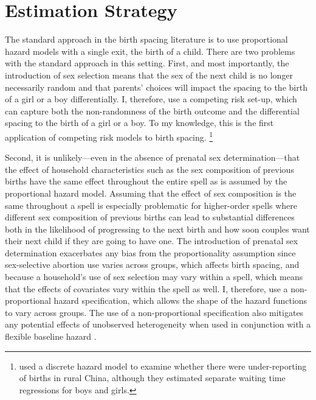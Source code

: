 \documentclass[12pt,letterpaper]{article}
\begin{document}


\section{Estimation Strategy\label{sec:strategy}}


The standard approach in the birth spacing literature is to use proportional hazard
models with a single exit, the birth of a child.
There are two problems with the standard approach in this setting.
First, and most importantly, the introduction of sex selection means that the sex of the 
next child is no longer necessarily random and that parents' choices will impact the 
spacing to the birth of a girl or a boy differentially.
I, therefore, use a competing risk set-up, which can capture both the non-randomness of
the birth outcome and the differential spacing to the birth of a girl or a boy.
To my knowledge, this is the first application of competing risk models to birth
spacing.%
\footnote{
\cite{Merli2000} used a discrete hazard model to examine whether 
there were under-reporting of births in rural China, although they 
estimated separate waiting time regressions for boys and girls.
}

Second, it is unlikely---even in the absence of prenatal sex determination---that the 
effect of household characteristics such as the sex composition of previous births have 
the same effect throughout the entire spell as is assumed by the proportional hazard
model.
Assuming that the effect of sex composition is the same throughout a spell is especially 
problematic for higher-order spells where different sex composition of previous births can 
lead to substantial differences both in the likelihood of progressing to the next birth 
and how soon couples want their next child if they are going to have one.
The introduction of prenatal sex determination exacerbates any bias from the 
proportionality assumption since sex-selective abortion use varies across groups,
which affects birth spacing, and because a household's use of sex selection may vary 
within a spell, which means that the effects of covariates vary within the spell as well.
I, therefore, use a non-proportional hazard specification, which allows the shape of the 
hazard functions to vary across groups.
The use of a non-proportional specification also mitigates any potential effects 
of unobserved heterogeneity when used in conjunction with a flexible baseline hazard 
\citep{Dolton1995}.
\end{document}
